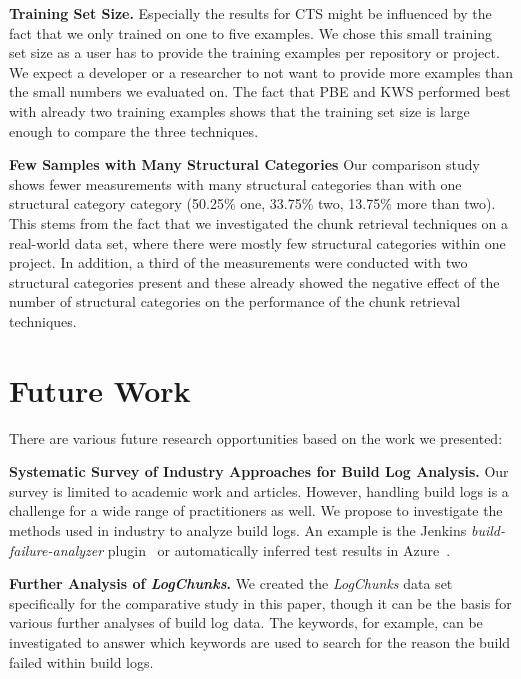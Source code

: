 \textbf{Training Set Size.}
Especially the results for CTS might be influenced by the fact that we
only trained on one to five examples.
We chose this small training set
size as a user has to provide the training examples
per repository or project.
We expect a developer or a researcher
to not want to provide more examples than the
small numbers we evaluated on.
The fact that PBE and KWS performed best with already two training
examples shows that the training set size is large enough to
compare the three techniques.

\textbf{Few Samples with Many Structural Categories}
Our comparison study shows fewer measurements with many structural
categories than with one structural category category
(50.25\% one, 33.75\% two, 13.75\% more than two).
This stems from the fact that we investigated the chunk retrieval
techniques on a real-world data set, where there were mostly few
structural categories within one project.
In addition, a third of the measurements were conducted with two
structural categories present and these already showed the negative
effect of the number of structural categories on the performance
of the chunk retrieval techniques.

\section{Future Work}

There are various future research opportunities based on the
work we presented:

\textbf{Systematic Survey of Industry Approaches for Build
Log Analysis.}
Our survey is limited to academic work and articles.
However, handling build logs is a challenge for a wide range of
practitioners as well.
We propose to investigate the methods used in industry to analyze
build logs.
An example is the Jenkins \emph{build-failure-analyzer}
plugin~\cite{jenkins2020failure-analyzer} or automatically
inferred test results in Azure~\cite{azure2020inferred}.

\textbf{Further Analysis of \emph{LogChunks}.}
We created the
\emph{LogChunks} data set \cite{brandt2020logchunks} specifically for
the comparative
study in this paper, though it can be the basis for various further
analyses of build log data.
The keywords, for example, can be
investigated to answer which keywords are used to search for the
reason the build failed within build logs.

